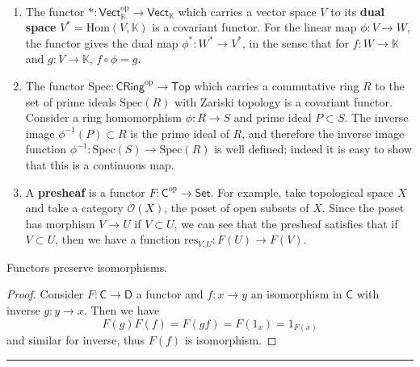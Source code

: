 \begin{exmp}
~\begin{enumerate}
\item The functor $*:\mathsf{Vect}_{\mathbb{K}}^{\mathrm{op}}\rightarrow \mathsf{Vect}_{\mathbb{K}}$ which carries a vector space $V$ to its \textbf{dual space} $V^*=\textrm{Hom}(V,\mathbb{K})$ is a covariant functor. For the linear map $\phi:V\rightarrow W$, the functor gives the dual map $\phi^*:W^*\rightarrow V^*$, in the sense that for $f:W\rightarrow \mathbb{K}$ and $g:V\rightarrow \mathbb{K}$, $f\circ \phi=g$.
\item The functor $\mathrm{Spec}:\mathsf{CRing}^{\mathrm{op}}\rightarrow \mathsf{Top}$ which carries a commutative ring $R$ to the set of prime ideals $\mathrm{Spec}(R)$ with Zariski topology is a covariant functor. Consider a ring homomorphism $\phi:R\rightarrow S$ and prime ideal $P\subset S$. The inverse image $\phi^{-1}(P)\subset R$ is the prime ideal of $R$, and therefore the inverse image function $\phi^{-1}:\mathrm{Spec}(S)\rightarrow \mathrm{Spec}(R)$ is well defined; indeed it is easy to show that this is a continuous map.
\item A \textbf{presheaf} is a functor $F:\mathsf{C}^{\mathrm{op}}\rightarrow \mathsf{Set}$. For example, take topological space $X$ and take a category $\mathcal{O}(X)$, the poset of open subsets of $X$. Since the poset has morphism $V\rightarrow U$ if $V\subset U$, we can see that the presheaf satisfies that if $V\subset U$, then we have a function $\mathrm{res}_{V,U}:F(U)\rightarrow F(V)$.
\end{enumerate}
\end{exmp}

\begin{lemma} Functors preserve isomorphisms.
\end{lemma}
\begin{proof} Consider $F:\mathsf{C}\rightarrow \mathsf{D}$ a functor and $f:x\rightarrow y$ an isomorphism in $\mathsf{C}$ with inverse $g:y\rightarrow x$. Then we have
\begin{equation}
F(g)F(f)=F(gf)=F(1_x)=1_{F(x)}
\end{equation}
and similar for inverse, thus $F(f)$ is isomorphism.
\end{proof}
\noindent\rule{\textwidth}{1pt}
\newline